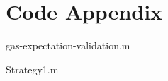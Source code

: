 \documentclass{article}
\begin{document}
%	
%	
%	
%	
%	
%	
%	
%	

\section{Code Appendix}

{gas-expectation-validation.m}


{Strategy1.m}
\end{document}
